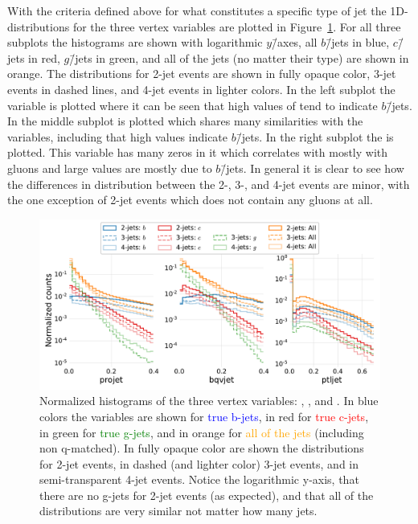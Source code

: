 With the criteria defined above for what constitutes a specific type of jet the 1D-distributions for the three vertex variables are plotted in Figure~\ref{fig:q:vertex_variables}. For all three subplots the histograms are shown with logarithmic $y$\=/axes, all $b$\=/jets in blue, $c$\=/jets in red, $g$\=/jets in green, and all of the jets (no matter their type) are shown in orange. The distributions for 2-jet events are shown in fully opaque color, 3-jet events in dashed lines, and 4-jet events in lighter colors. In the left subplot the  variable is plotted where it can be seen that high values of  tend to indicate $b$\=/jets. In the middle subplot  is plotted which shares many similarities with the  variables, including that high values indicate $b$\=/jets. In the right subplot the  is plotted. This variable has many zeros in it which correlates with mostly with gluons and large values are mostly due to $b$\=/jets. In general it is clear to see how the differences in distribution between the \num{2}-, \num{3}-, and \num{4}-jet events are minor, with the one exception of \num{2}-jet events which does not contain any gluons at all. 

\begin{figure}[h!]
  \includegraphics[width=1\textwidth, trim=10 10 5 5, clip]{figures/quarks/btagging_variables_hist-down_sample=1.00-ML_vars=vertex-selection=b-ejet_min=4-n_iter_RS_lgb=99-n_iter_RS_xgb=9-cdot_cut=0.90-version=19.pdf}
  \caption[Histograms of the vertex variables]
          {Normalized histograms of the three vertex variables: , , and . In blue colors the variables are shown for \textcolor{blue}{true b-jets}, in red for \textcolor{red}{true c-jets}, in green for \textcolor{green}{true g-jets}, and in orange for \textcolor{orange}{all of the jets} (including non q-matched). In fully opaque color are shown the distributions for 2-jet events, in dashed (and lighter color) 3-jet events, and in semi-transparent 4-jet events. Notice the logarithmic y-axis, that there are no g-jets for 2-jet events (as expected), and that all of the distributions are very similar not matter how many jets.
          } 
  \label{fig:q:vertex_variables}
\end{figure}

